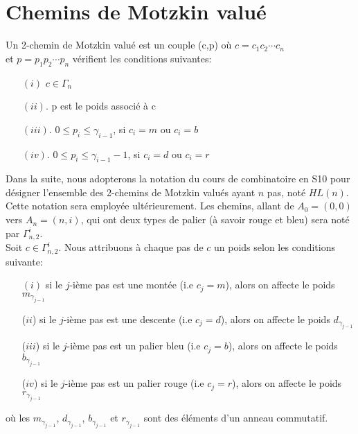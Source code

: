 \section{Chemins de Motzkin valué}
\begin{definition}
	\begin{rm}
		Un 2-chemin de Motzkin valué est un couple (c,p) où $c = c_{1}c_{2}\cdots c_{n}$\\ et $p = p_{1}p_{2}\cdots p_{n}$
		vérifient les conditions suivantes:
		\begin{itemize}
			\item[$(i)$] $c \in \Gamma_{n}$
			\item[$(ii)$.] p est le poids associé à c
			\item[$(iii)$.] $0\leq p_{i}\leq \gamma_{i-1}$, si $c_{i}=m\text{ ou }c_{i}=b$
			\item[$(iv)$.]  $0\leq p_{i}\leq \gamma_{i-1} - 1$, si  $c_{i}=d\text{ ou }c_{i}=r$
		\end{itemize}
	\end{rm}
\end{definition}
Dans la suite, nous adopterons la notation du cours de combinatoire en S10 pour désigner l'ensemble des 2-chemins de Motzkin valués ayant $n$ pas, noté $HL(n)$. Cette notation sera employée ultérieurement. Les chemins, allant de $A_{0}=(0, 0)$ vers $A_{n}=(n, i)$, qui ont deux types de palier (à savoir rouge et bleu) sera noté par $\Gamma_{n, 2}^{i}$. \\
Soit $c \in \Gamma_{n, 2}^{i}$. Nous attribuons à chaque pas de $c$ un poids selon les conditions suivante:
\begin{itemize}
	\item [$(i)$] si le $j$-ième pas est une montée (i.e $c_{j}=m$), alors on affecte le poids $m_{\gamma_{j-1}}$
	\item [($ii$)] si le $j$-ième pas est une descente (i.e $c_{j}=d$), alors on affecte le poids $d_{\gamma_{j-1}}$
	\item [($iii$)]  si le $j$-ième pas est un palier bleu (i.e $c_{j}=b$), alors on affecte le poids $b_{\gamma_{j-1}}$
	\item [($iv$)]  si le $j$-ième pas est un palier rouge (i.e $c_{j}=r$), alors on affecte le poids $r_{\gamma_{j-1}}$
\end{itemize}
où les  $m_{\gamma_{j-1}}$, $d_{\gamma_{j-1}}$, $b_{\gamma_{j-1}}$ et  $r_{\gamma_{j-1}}$ sont des éléments d'un anneau commutatif.\vspace{10pt}\\
